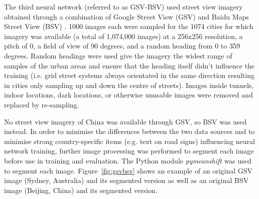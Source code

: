 \documentclass[Crown,sageh,times]{sagej}
\begin{document}
The third neural network (referred to as GSV-BSV) used street view imagery obtained through a combination of Google Street View (GSV) \citep{GoogleMaps2017b} and Baidu Maps Street View (BSV) \citep{Baidu2017}. 1000 images each were sampled for the 1074 cities for which imagery was available (a total of 1,074,000 images) at a 256x256 resolution, a pitch of 0, a field of view of 90 degrees, and a random heading from 0 to 359 degrees. Random headings were used give the imagery the widest range of samples of the urban areas and ensure that the heading itself didn't influence the training (i.e. grid street systems always orientated in the same direction resulting in cities only sampling up and down the centre of streets). Images inside tunnels, indoor locations, dark locations, or otherwise unusable images were removed and replaced by re-sampling.

No street view imagery of China was available through GSV, so BSV was used instead.  In order to minimise the differences between the two data sources and to minimise strong country-specific items (e.g. text on road signs) influencing neural network training, further image processing was performed to segment each image before use in training and evaluation. The Python module \textit{pymeanshift} \citep{Pymeanshift2017} was used to segment each image. Figure~\ref{fig:gsvbsv} shows an example of an original GSV image (Sydney, Australia) and its segmented version as well as an original BSV image (Beijing, China) and its segmented version.

\end{document}
